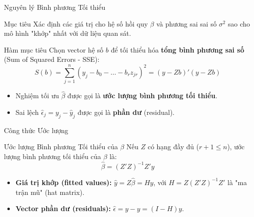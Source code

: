 \begin{frame}{Nguyên lý Bình phương Tối thiểu}
    \begin{block}{Mục tiêu}
        Xác định các giá trị cho hệ số hồi quy $\beta$ và phương sai sai số $\sigma^2$ sao cho mô hình "khớp" nhất với dữ liệu quan sát.
    \end{block}

    \pause
    \begin{alertblock}{Hàm mục tiêu}
        Chọn vector hệ số $b$ để tối thiểu hóa \textbf{tổng bình phương sai số} (Sum of Squared Errors - SSE):
        \[
            S(b) = \sum_{j=1}^{n} (y_j - b_0 - \dots - b_rz_{jr})^2 = (y - Zb)'(y - Zb)
        \]
    \end{alertblock}

    \pause
    \begin{itemize}
        \item Nghiệm tối ưu $\hat{\beta}$ được gọi là \textbf{ước lượng bình phương tối thiểu}.
        \item Sai lệch $\hat{\epsilon}_j = y_j - \hat{y}_j$ được gọi là \textbf{phần dư} (residual).
    \end{itemize}
\end{frame}

\begin{frame}{Công thức Ước lượng}
    \begin{block}{Ước lượng Bình phương Tối thiểu của $\beta$}
        Nếu $Z$ có hạng đầy đủ ($r+1 \le n$), ước lượng bình phương tối thiểu của $\beta$ là:
        \[
            \hat{\beta} = (Z'Z)^{-1}Z'y
        \]
    \end{block}

    \pause
    \begin{itemize}
        \item \textbf{Giá trị khớp (fitted values):} $\hat{y} = Z\hat{\beta} = Hy$, với $H=Z(Z'Z)^{-1}Z'$ là "ma trận mũ" (hat matrix).
        \pause
        \item \textbf{Vector phần dư (residuals):} $\hat{\epsilon} = y - \hat{y} = (I-H)y$.
    \end{itemize}
\end{frame}

